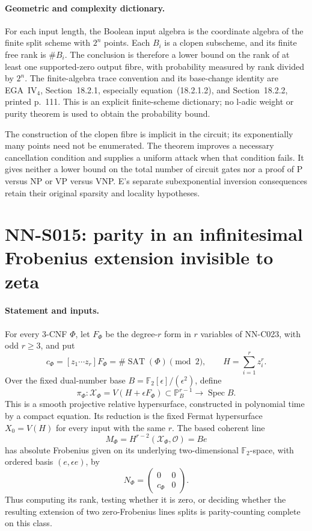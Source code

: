 \paragraph{Geometric and complexity dictionary.}
For each input length, the Boolean input algebra is the coordinate
algebra of the finite split scheme with $2^n$ points. Each $B_i$ is a
clopen subscheme, and its finite free rank is $\#B_i$.
The conclusion is therefore a lower bound on the rank of at least one
supported-zero output fibre, with probability measured by rank divided
by $2^n$. The finite-algebra trace convention and its base-change
identity are EGA~IV$_4$, Section~18.2.1, especially equation~(18.2.1.2),
and Section~18.2.2, printed p.~111. This is an explicit finite-scheme
dictionary; no l-adic weight or purity theorem is used to obtain the
probability bound.

The construction of the clopen fibre is implicit in the circuit;
its exponentially many points need not be enumerated. The theorem
improves a necessary cancellation condition and supplies a uniform
attack when that condition fails. It gives neither a lower bound on
the total number of circuit gates nor a proof of P versus NP or
VP versus VNP. E's separate subexponential inversion consequences
retain their original sparsity and locality hypotheses.


\section{NN-S015: parity in an infinitesimal Frobenius extension invisible to zeta}

\paragraph{Statement and inputs.}
For every 3-CNF $\Phi$, let $F_\Phi$ be the degree-$r$ form in
$r$ variables of NN-C023, with odd $r\ge3$, and put
\[
 c_\Phi=[z_1\cdots z_r]F_\Phi
       =\#\operatorname{SAT}(\Phi)\pmod2,\qquad
 H=\sum_{i=1}^r z_i^r.
\]
Over the fixed dual-number base
$B=\mathbb F_2[\epsilon]/(\epsilon^2)$, define
\[
 \pi_\Phi:\mathcal X_\Phi
   =V(H+\epsilon F_\Phi)\subset\mathbb P^{r-1}_B
                  \longrightarrow\operatorname{Spec}B.
\]
This is a smooth projective relative hypersurface, constructed in
polynomial time by a compact equation. Its reduction is the fixed
Fermat hypersurface $X_0=V(H)$ for every input with the same $r$.
The based coherent line
\[
 M_\Phi=H^{r-2}(\mathcal X_\Phi,\mathcal O)=B e
\]
has absolute Frobenius given on its underlying two-dimensional
$\mathbb F_2$-space, with ordered basis $(e,\epsilon e)$, by
\[
       N_\Phi=
       \begin{pmatrix}0&0\\c_\Phi&0\end{pmatrix}.       \tag{S015.1}
\]
Thus computing its rank, testing whether it is zero, or deciding whether
the resulting extension of two zero-Frobenius lines splits is
parity-counting complete on this class.

